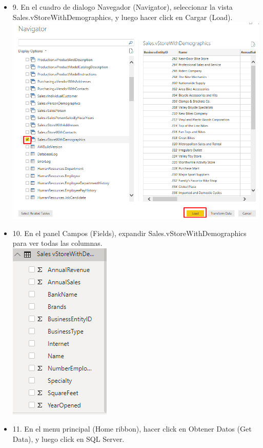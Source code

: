 \begin{itemize}
\item 9. En el cuadro de dialogo Navegador (Navigator), seleccionar la vista Sales.vStoreWithDemographics, y luego
hacer click en Cargar (Load). \\
\includegraphics[scale=0.8]{./Imagenes/image008}
\item 10. En el panel Campos (Fields), expandir Sales.vStoreWithDemographics para ver todas las columnas. \\
\includegraphics[scale=0.5]{./Imagenes/image009}
\item 11. En el menu principal (Home ribbon), hacer click en Obtener Datos (Get Data), y luego click en SQL Server. \\

\end{itemize}
